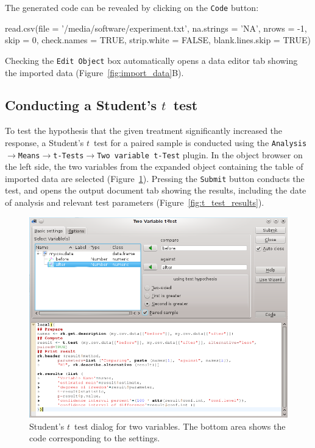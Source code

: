 The generated  code can be revealed by clicking on the \texttt{Code} button:

\begin{Code}
read.csv(file = '/media/software/experiment.txt',
         na.strings = 'NA', nrows = -1, skip = 0,
         check.names = TRUE, strip.white = FALSE, blank.lines.skip = TRUE)
\end{Code}

Checking the \texttt{Edit Object} box automatically opens a data editor tab
showing the imported data (Figure~\ref{fig:import_data}B).

\subsection{Conducting a Student's $t$~test}
\label{sec:conducting_ttest}
To test the hypothesis that the given treatment significantly increased the response, a Student's
$t$~test for a paired sample is conducted using the
\texttt{Analysis$\rightarrow$Means$\rightarrow$t-Tests$\rightarrow$Two variable t-Test} plugin.
In the object browser on the left side, the two variables from the expanded
 object containing the table of imported data 
are selected (Figure~\ref{fig:t_test_dialog}). 
Pressing the \texttt{Submit} button conducts the test, and opens the output document tab
showing the results, including the date of analysis and relevant test parameters (Figure~\ref{fig:t_test_results}).

\begin{figure}[b!]
 \centering
 \includegraphics[width=13.5cm]{./figures/t-test_dialog.png}
 \caption{Student's $t$~test dialog for two variables. The bottom area shows the  code corresponding to the settings.}
 \label{fig:t_test_dialog}
\end{figure}

